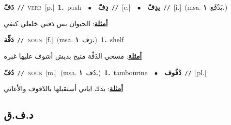 \documentclass[10pt,a4paper,twoside]{article} %
\begin{document}
\begin{multicols}{2}
{\setlength\topsep{0pt}\textbf{\foreignlanguage{arabic}{دَفّ}}\ {\color{gray}\texttt{//}\color{black}}\ \textsc{verb}\ [p.]\ \textbf{1.}~push\ \ $\bullet$\ \ \setlength\topsep{0pt}\textbf{\foreignlanguage{arabic}{دِفّ}}\ {\color{gray}\texttt{//}\color{black}}\ [c.]\ \ $\bullet$\ \ \setlength\topsep{0pt}\textbf{\foreignlanguage{arabic}{يدِفّ}}\ {\color{gray}\texttt{//}\color{black}}\ [i.]\ \color{gray}(msa. \foreignlanguage{arabic}{يَدْفَع}~\foreignlanguage{arabic}{\textbf{١.}})\color{black}\  \begin{flushright}\color{gray}\foreignlanguage{arabic}{\textbf{\underline{\foreignlanguage{arabic}{أمثلة}}}: الحيوان بس دَفني خلعلي كتفي}\end{flushright}\color{black}} \vspace{2mm}

{\setlength\topsep{0pt}\textbf{\foreignlanguage{arabic}{دَفِّة}}\ {\color{gray}\texttt{//}\color{black}}\ \textsc{noun}\ [f.]\ \color{gray}(msa. \foreignlanguage{arabic}{رَف}~\foreignlanguage{arabic}{\textbf{١.}})\color{black}\ \textbf{1.}~shelf\  \begin{flushright}\color{gray}\foreignlanguage{arabic}{\textbf{\underline{\foreignlanguage{arabic}{أمثلة}}}: مسحي الدَفِّة منيح بديش أشوف عليها غبرة}\end{flushright}\color{black}} \vspace{2mm}

{\setlength\topsep{0pt}\textbf{\foreignlanguage{arabic}{دُفّ}}\ {\color{gray}\texttt{//}\color{black}}\ \textsc{noun}\ [m.]\ \color{gray}(msa. \foreignlanguage{arabic}{دُف}~\foreignlanguage{arabic}{\textbf{١.}})\color{black}\ \textbf{1.}~tambourine\ \ $\bullet$\ \ \setlength\topsep{0pt}\textbf{\foreignlanguage{arabic}{دْفُوف}}\ {\color{gray}\texttt{//}\color{black}}\ [pl.]\  \begin{flushright}\color{gray}\foreignlanguage{arabic}{\textbf{\underline{\foreignlanguage{arabic}{أمثلة}}}: بدك اياني أستقبلها بالدْفوف والأغاني}\end{flushright}\color{black}} \vspace{2mm}

\vspace{-3mm}
\subsection*{\color{blue}\foreignlanguage{arabic}{د.ف.ق}\color{blue}{}} 


\end{multicols}
\end{document}
